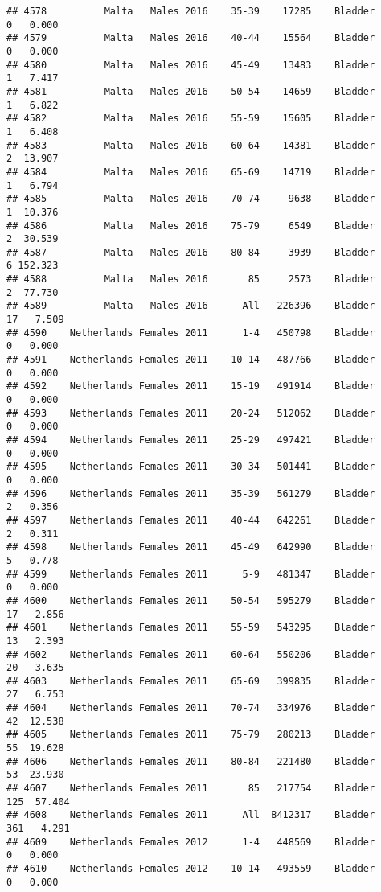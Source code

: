 \documentclass[
]{article}
\begin{document}
\begin{verbatim}
## 4578          Malta   Males 2016    35-39    17285    Bladder      0   0.000
## 4579          Malta   Males 2016    40-44    15564    Bladder      0   0.000
## 4580          Malta   Males 2016    45-49    13483    Bladder      1   7.417
## 4581          Malta   Males 2016    50-54    14659    Bladder      1   6.822
## 4582          Malta   Males 2016    55-59    15605    Bladder      1   6.408
## 4583          Malta   Males 2016    60-64    14381    Bladder      2  13.907
## 4584          Malta   Males 2016    65-69    14719    Bladder      1   6.794
## 4585          Malta   Males 2016    70-74     9638    Bladder      1  10.376
## 4586          Malta   Males 2016    75-79     6549    Bladder      2  30.539
## 4587          Malta   Males 2016    80-84     3939    Bladder      6 152.323
## 4588          Malta   Males 2016       85     2573    Bladder      2  77.730
## 4589          Malta   Males 2016      All   226396    Bladder     17   7.509
## 4590    Netherlands Females 2011      1-4   450798    Bladder      0   0.000
## 4591    Netherlands Females 2011    10-14   487766    Bladder      0   0.000
## 4592    Netherlands Females 2011    15-19   491914    Bladder      0   0.000
## 4593    Netherlands Females 2011    20-24   512062    Bladder      0   0.000
## 4594    Netherlands Females 2011    25-29   497421    Bladder      0   0.000
## 4595    Netherlands Females 2011    30-34   501441    Bladder      0   0.000
## 4596    Netherlands Females 2011    35-39   561279    Bladder      2   0.356
## 4597    Netherlands Females 2011    40-44   642261    Bladder      2   0.311
## 4598    Netherlands Females 2011    45-49   642990    Bladder      5   0.778
## 4599    Netherlands Females 2011      5-9   481347    Bladder      0   0.000
## 4600    Netherlands Females 2011    50-54   595279    Bladder     17   2.856
## 4601    Netherlands Females 2011    55-59   543295    Bladder     13   2.393
## 4602    Netherlands Females 2011    60-64   550206    Bladder     20   3.635
## 4603    Netherlands Females 2011    65-69   399835    Bladder     27   6.753
## 4604    Netherlands Females 2011    70-74   334976    Bladder     42  12.538
## 4605    Netherlands Females 2011    75-79   280213    Bladder     55  19.628
## 4606    Netherlands Females 2011    80-84   221480    Bladder     53  23.930
## 4607    Netherlands Females 2011       85   217754    Bladder    125  57.404
## 4608    Netherlands Females 2011      All  8412317    Bladder    361   4.291
## 4609    Netherlands Females 2012      1-4   448569    Bladder      0   0.000
## 4610    Netherlands Females 2012    10-14   493559    Bladder      0   0.000

\end{verbatim}
\end{document}
